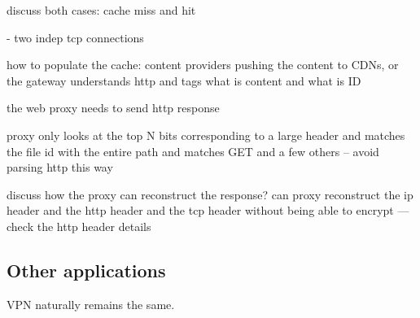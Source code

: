 discuss both cases: cache miss and hit

- two indep tcp connections 

how to populate the cache: content providers pushing the content to CDNs, or the gateway understands
http and tags what is content and what is ID

the web proxy needs to send http response 

proxy only looks at the top N bits corresponding to a large header and matches the file id with the entire path
and matches GET and a few others -- avoid parsing http this way


discuss how the proxy can reconstruct the response?
can proxy reconstruct the ip header and the http header  and the tcp header without being able to encrypt
--- check the http header details


\subsection{Other applications}\label{sec:vpn} \label{sec:other} \label{sec:not_supp}

VPN naturally remains the same. 
